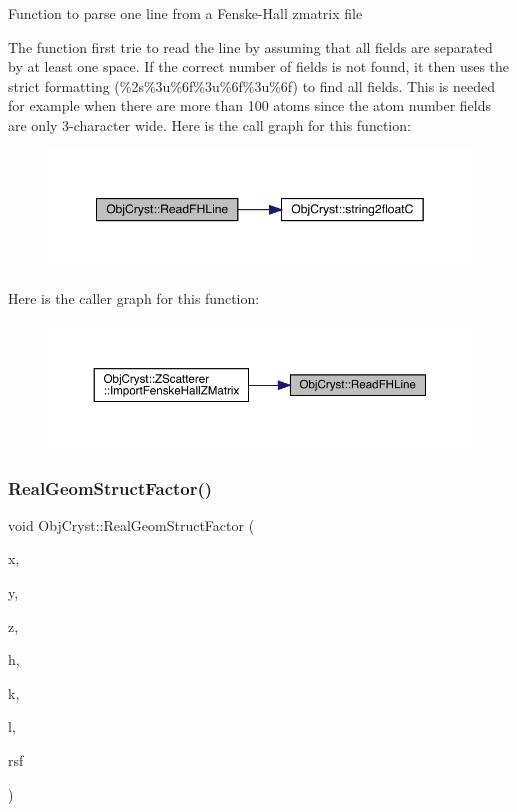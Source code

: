 Function to parse one line from a Fenske-\/\+Hall zmatrix file

The function first trie to read the line by assuming that all fields are separated by at least one space. If the correct number of fields is not found, it then uses the strict formatting (\%2s\%3u\%6f\%3u\%6f\%3u\%6f) to find all fields. This is needed for example when there are more than 100 atoms since the atom number fields are only 3-\/character wide. Here is the call graph for this function\+:
\nopagebreak
\begin{figure}[H]
\begin{center}
\leavevmode
\includegraphics[width=349pt]{namespace_obj_cryst_a36ff196370e39131e82f33eb55306c6d_cgraph}
\end{center}
\end{figure}
Here is the caller graph for this function\+:
\nopagebreak
\begin{figure}[H]
\begin{center}
\leavevmode
\includegraphics[width=350pt]{namespace_obj_cryst_a36ff196370e39131e82f33eb55306c6d_icgraph}
\end{center}
\end{figure}
\mbox{\label{namespace_obj_cryst_a7156318988075f0da9afae54c0b6342b}} 
\subsubsection{\texorpdfstring{RealGeomStructFactor()}{RealGeomStructFactor()}}
{\footnotesize\ttfamily void Obj\+Cryst\+::\+Real\+Geom\+Struct\+Factor (\begin{DoxyParamCaption}\item[{const R\+E\+AL}]{x,  }\item[{const R\+E\+AL}]{y,  }\item[{const R\+E\+AL}]{z,  }\item[{const Cryst\+Vector\+\_\+\+R\+E\+AL \&}]{h,  }\item[{const Cryst\+Vector\+\_\+\+R\+E\+AL \&}]{k,  }\item[{const Cryst\+Vector\+\_\+\+R\+E\+AL \&}]{l,  }\item[{Cryst\+Vector\+\_\+\+R\+E\+AL \&}]{rsf }\end{DoxyParamCaption})}

